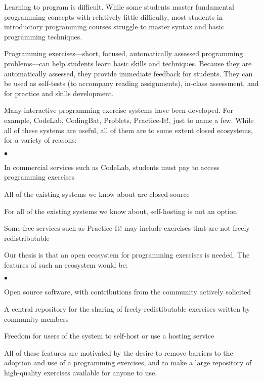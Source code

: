 \documentclass[11pt]{article}
\newenvironment{denseItemize}{%
\begin{list}{$\bullet$}{\setlength{\itemsep}{0in}\setlength{\parsep}{.05in}}}{\end{list}}
\begin{document}
Learning to program is difficult.  While some students master
fundamental programming concepts with relatively little difficulty,
most students in introductory programming courses struggle
to master syntax and basic programming techniques.

Programming exercises---short, focused, automatically assessed
programming problems---can help students learn basic skills and techniques.
Because they are automatically assessed, they provide immediate feedback
for students.  They can be used as self-tests (to accompany reading assignments),
in-class assessment, and for practice and skills development.

Many interactive programming exercise systems have been developed.
For example, CodeLab, CodingBat, Problets, Practice-It!, just to
name a few.  While all of these systems are useful, all of
them are to some extent closed ecosystems, for a variety of reasons:

\begin{denseItemize}
\item In commercial services such as CodeLab,
      students must pay to access programming exercises
\item All of the existing systems we know about are closed-source
\item For all of the existing systems we know about,
      self-hosting is not an option
\item Some free services such as Practice-It! may include
      exercises that are not freely redistributable
\end{denseItemize}

Our thesis is that an open ecosystem for programming exercises
is needed.  The features of such an ecosystem would be:

\begin{denseItemize}
\item Open source software, with contributions from the community
      actively solicited
\item A central repository for the sharing of freely-redistibutable exercises
      written by community members
\item Freedom for users of the system to self-host or use a hosting service
\end{denseItemize}

All of these features are motivated by the desire to remove 
barriers to the adoption and use of a programming exercises,
and to make a large repository of high-quality exercises available
for anyone to use.
\end{document}

